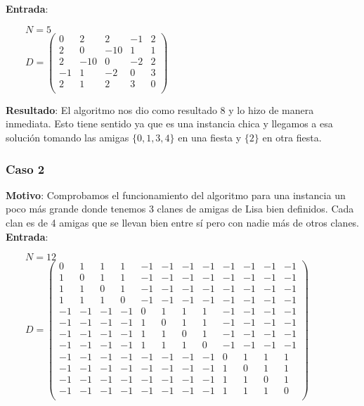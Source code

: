 \textbf{Entrada}:

\begin{flushleft}
$\qquad N = 5$\\[10pt]
$\qquad D = \left( \begin{smallmatrix}
0 & 2 & 2 & -1 & 2 \\
2 & 0 & -10 & 1 & 1 \\
2 & -10 & 0 & -2 & 2 \\
-1 & 1 & -2 & 0 & 3 \\
2 & 1 & 2 & 3 & 0 \\
\end{smallmatrix} \right)$
\end{flushleft}

\textbf{Resultado}: El algoritmo nos dio como resultado 8 y lo hizo de manera inmediata. Esto tiene sentido ya 
que es una instancia chica y llegamos a esa solución tomando las amigas $\{ 0, 1, 3, 4 \}$ en una fiesta y $\{ 2 \}$ en otra fiesta.

\subsubsection*{Caso 2}

\textbf{Motivo}: Comprobamos el funcionamiento del algoritmo para una instancia un poco más grande donde tenemos 3 clanes de amigas de Lisa bien definidos. 
Cada clan es de 4 amigas que se llevan bien entre sí pero con nadie más de otros clanes. \\

\textbf{Entrada}:

\begin{flushleft}
$\qquad N = 12$\\[10pt]
$\qquad D = \left( \begin{smallmatrix}
0 & 1 & 1 & 1 & -1 & -1 & -1 & -1 & -1 & -1 & -1 & -1 \\
1 & 0 & 1 & 1 & -1 & -1 & -1 & -1 & -1 & -1 & -1 & -1 \\
1 & 1 & 0 & 1 & -1 & -1 & -1 & -1 & -1 & -1 & -1 & -1 \\
1 & 1 & 1 & 0 & -1 & -1 & -1 & -1 & -1 & -1 & -1 & -1 \\
-1 & -1 & -1 & -1 & 0 & 1 & 1 & 1 & -1 & -1 & -1 & -1 \\
-1 & -1 & -1 & -1 & 1 & 0 & 1 & 1 & -1 & -1 & -1 & -1 \\
-1 & -1 & -1 & -1 & 1 & 1 & 0 & 1 & -1 & -1 & -1 & -1 \\
-1 & -1 & -1 & -1 & 1 & 1 & 1 & 0 & -1 & -1 & -1 & -1 \\
-1 & -1 & -1 & -1 & -1 & -1 & -1 & -1 & 0 & 1 & 1 & 1 \\
-1 & -1 & -1 & -1 & -1 & -1 & -1 & -1 & 1 & 0 & 1 & 1 \\
-1 & -1 & -1 & -1 & -1 & -1 & -1 & -1 & 1 & 1 & 0 & 1 \\
-1 & -1 & -1 & -1 & -1 & -1 & -1 & -1 & 1 & 1 & 1 & 0 \\
\end{smallmatrix} \right)$
\end{flushleft}

